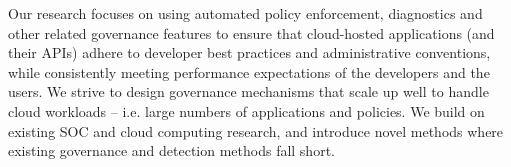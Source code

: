 Our research focuses on using automated policy enforcement, diagnostics and other related 
governance features to ensure that
cloud-hosted applications (and their APIs) adhere to developer best practices 
and administrative conventions, while
consistently meeting performance expectations of the developers and the users. We strive to design
governance mechanisms that scale up well to handle cloud workloads -- i.e. large numbers of applications
and policies. We build on existing SOC and cloud computing research, and introduce novel methods
where existing governance and detection methods fall short. 
